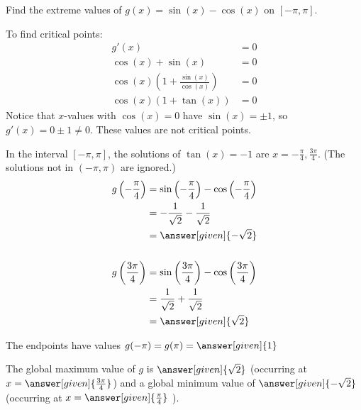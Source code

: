 \documentclass{ximera}
\begin{document}
\begin{example}
	Find the extreme values of $g(x) = \sin(x) - \cos(x)$ on $[-\pi, \pi]$.
	\begin{explanation}
		To find critical points:
			\begin{align*}
				g'(x) &= 0\\
				\cos(x) + \sin(x) &= 0\\
				\cos(x)\left( 1 + \frac{\sin(x)}{\cos(x)} \right) &= 0\\
				\cos(x) \left( 1 + \tan(x) \right) &= 0
			\end{align*}
			Notice that $x$-values with $\cos(x) = 0$ have $\sin(x) = \pm 1$, so
			$g'(x) = 0 \pm 1 \neq 0$.  These values are not critical points.

			In the interval $[-\pi, \pi]$, the solutions of $\tan(x) = -1$ are 
			$x = -\frac{\pi}{4}, \frac{3\pi}{4}$.  (The solutions not in $(-\pi, \pi)$ are ignored.)
			\begin{align*}
				g\left( -\frac{\pi}{4} \right) &= \sin\left( -\frac{\pi}{4} \right) - \cos\left( -\frac{\pi}{4} \right)\\
					&= -\frac{1}{\sqrt{2}} - \frac{1}{\sqrt{2}}\\
					&= \answer[given]{-\sqrt{2}}\\
					\\
				g\left( \frac{3\pi}{4} \right) &= \sin\left( \frac{3\pi}{4} \right) - \cos\left( \frac{3\pi}{4} \right)\\
					&= \frac{1}{\sqrt{2}} + \frac{1}{\sqrt{2}}\\
					&= \answer[given]{\sqrt{2}}
			\end{align*}						
								
			The endpoints have values $g( -\pi ) = g(\pi) = \answer[given]{1}$
			
			The global maximum value of $g$ is $\answer[given]{\sqrt{2}}$ 
			(occurring at $x=\answer[given]{\frac{3\pi}{4}}$) and a 
			global minimum value of $\answer[given]{-\sqrt{2}}$ (occurring at $x=\answer[given]{\frac{\pi}{4} }$ ).
	\end{explanation}
\end{example}
\end{document}
